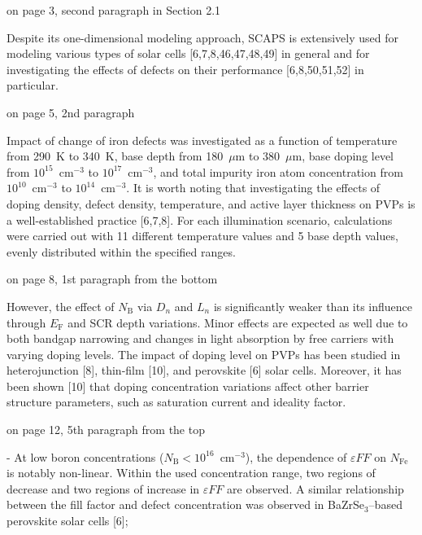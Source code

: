 \documentclass[a4paper,fleqn]{cas-sc}
\begin{document}
on page 3, second paragraph in Section 2.1


\begin{mdframed}
Despite its one-dimensional modeling approach, SCAPS is extensively used for modeling various types
of solar cells [\textcolor[rgb]{1.00,0.07,0.00}{6,7,8},46,47,48,49] in general
and for investigating the effects of defects on their performance [\textcolor[rgb]{1.00,0.07,0.00}{6,8,}50,51,52] in particular.
\end{mdframed}


on page 5, 2nd paragraph

\begin{mdframed}
Impact of change of iron defects was investigated as a function of temperature from 290~K to 340~K,
base depth from 180~$\mu$m to 380~$\mu$m,
base doping level from $10^{15}$~cm$^{-3}$ to $10^{17}$~cm$^{-3}$,
and total impurity iron atom concentration from $10^{10}$~cm$^{-3}$ to $10^{14}$~cm$^{-3}$.
\textcolor[rgb]{1.00,0.07,0.00}{It is worth noting that investigating the effects of doping density, defect density, temperature, and active layer thickness on PVPs is a well-established practice [6,7,8].}
For each illumination scenario, calculations were carried out with 11 different temperature values and 5 base depth values,
evenly distributed within the specified ranges.
\end{mdframed}

on page 8, 1st paragraph from the bottom

\begin{mdframed}
However, the effect of $N_\mathrm{B}$ via $D_n$ and $L_n$ is significantly weaker than its influence through $E_\mathrm{F}$ and SCR depth variations.
Minor effects are expected as well due to both bandgap narrowing and changes in light absorption by free carriers with varying doping levels.
\textcolor[rgb]{1.00,0.07,0.00}{The impact of doping level on PVPs has been studied in heterojunction [8],
thin-film [10],
and perovskite [6] solar cells.}
Moreover, it has been shown [10] that
doping concentration variations affect other barrier structure parameters, such as saturation current and ideality factor.
\end{mdframed}

on page 12, 5th paragraph from the top

\begin{mdframed}
- At low boron concentrations ($N_\mathrm{B}<10^{16}$~cm$^{-3}$),
the dependence of $\varepsilon F\!F$ on $N_\mathrm{Fe}$ is notably non-linear.
Within the used concentration range, two regions of decrease and two regions of increase in $\varepsilon F\!F$ are observed.
\textcolor[rgb]{1.00,0.07,0.00}{A similar relationship between the fill factor and defect concentration was observed in BaZrSe$_3$--based perovskite solar cells [6]};
\end{mdframed}
\end{document}
